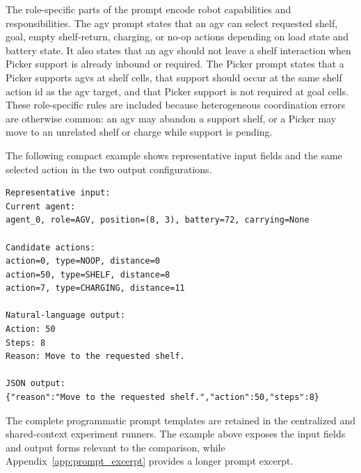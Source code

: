 The role-specific parts of the prompt encode robot capabilities and responsibilities.
The \gls{agv} prompt states that an \gls{agv} can select requested shelf, goal, empty shelf-return, charging, or no-op actions depending on load state and battery state.
It also states that an \gls{agv} should not leave a shelf interaction when Picker support is already inbound or required.
The Picker prompt states that a Picker supports \glspl{agv} at shelf cells, that support should occur at the same shelf action id as the \gls{agv} target, and that Picker support is not required at goal cells.
These role-specific rules are included because heterogeneous coordination errors are otherwise common: an \gls{agv} may abandon a support shelf, or a Picker may move to an unrelated shelf or charge while support is pending.

The following compact example shows representative input fields and the same selected action in the two output configurations.

\begin{lstlisting}[caption=Representative prompt input and corresponding natural-language and JSON outputs., label=listing:representative_prompt_io]
Representative input:
Current agent:
agent_0, role=AGV, position=(8, 3), battery=72, carrying=None

Candidate actions:
action=0, type=NOOP, distance=0
action=50, type=SHELF, distance=8
action=7, type=CHARGING, distance=11

Natural-language output:
Action: 50
Steps: 8
Reason: Move to the requested shelf.

JSON output:
{"reason":"Move to the requested shelf.","action":50,"steps":8}
\end{lstlisting}

The complete programmatic prompt templates are retained in the centralized and shared-context experiment runners. The example above exposes the input fields and output forms relevant to the comparison, while Appendix~\ref{app:prompt_excerpt} provides a longer prompt excerpt.

